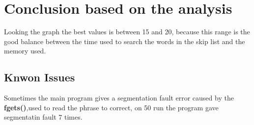 \section{Conclusion based on the analysis}
Looking the graph the best values is between 15 and 20, because this range is the good balance between the time used to search the words in the skip list and the memory used. 

\subsection{Knwon Issues}
Sometimes the main program gives a segmentation fault error caused by the \textbf{fgets()},used to read the phrase to correct, on 50 run the program gave segmentatin fault 7 times.